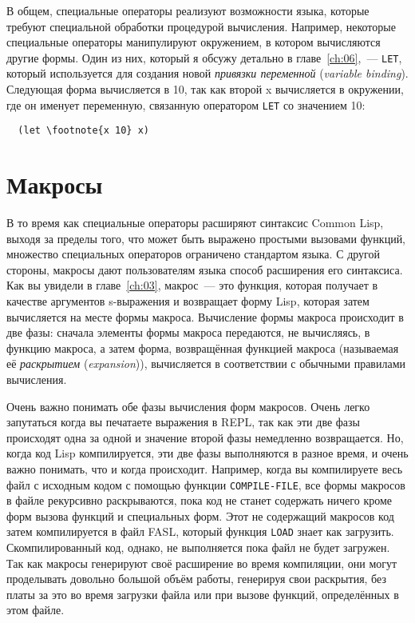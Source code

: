 В общем, специальные операторы реализуют возможности языка, которые требуют специальной
обработки процедурой вычисления. Например, некоторые специальные операторы манипулируют
окружением, в котором вычисляются другие формы. Один из них, который я обсужу детально в
главе~\ref{ch:06},~--- \lstinline{LET}, который используется для создания новой \textit{привязки
  переменной} (\textit{variable binding}). Следующая форма вычисляется в 10, так как
второй x вычисляется в окружении, где он именует переменную, связанную оператором
\lstinline{LET} со значением 10:

\begin{lstlisting}
  (let \footnote{x 10} x)
\end{lstlisting}

\section{Макросы}

В то время как специальные операторы расширяют синтаксис Common Lisp, выходя за пределы
того, что может быть выражено простыми вызовами функций, множество специальных операторов
ограничено стандартом языка. С другой стороны, макросы дают пользователям языка способ
расширения его синтаксиса. Как вы увидели в главе~\ref{ch:03}, макрос~--- это функция, которая
получает в качестве аргументов s-выражения и возвращает форму Lisp, которая затем
вычисляется на месте формы макроса. Вычисление формы макроса происходит в две фазы:
сначала элементы формы макроса передаются, не вычисляясь, в функцию макроса, а затем
форма, возвращённая функцией макроса (называемая её \textit{раскрытием}
(\textit{expansion})), вычисляется в соответствии с обычными правилами вычисления.

Очень важно понимать обе фазы вычисления форм макросов. Очень легко запутаться когда вы
печатаете выражения в REPL, так как эти две фазы происходят одна за одной и значение
второй фазы немедленно возвращается. Но, когда код Lisp компилируется, эти две фазы
выполняются в разное время, и очень важно понимать, что и когда происходит. Например,
когда вы компилируете весь файл с исходным кодом с помощью функции \lstinline{COMPILE-FILE},
все формы макросов в файле рекурсивно раскрываются, пока код не станет содержать ничего
кроме форм вызова функций и специальных форм. Этот не содержащий макросов код затем
компилируется в файл FASL, который функция \lstinline{LOAD} знает как
загрузить. Скомпилированный код, однако, не выполняется пока файл не будет загружен. Так
как макросы генерируют своё расширение во время компиляции, они могут проделывать довольно
большой объём работы, генерируя свои раскрытия, без платы за это во время загрузки файла
или при вызове функций, определённых в этом файле.

